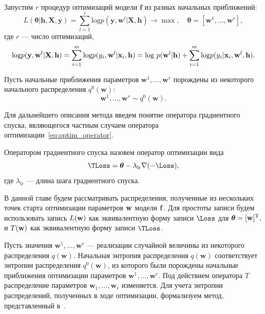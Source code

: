 Запустим $r$ процедур оптимизаций модели $\mathbf{f}$ из разных начальных приближений:
\[
	L( \boldsymbol{\theta}| \mathbf{h}, \mathbf{X}, \mathbf{y}) = \sum_{l=1}^r \text{log}p(\mathbf{y}, \mathbf{w}^l|\mathbf{X}, \mathbf{h})  \to \max, \quad \boldsymbol{\theta} = [\mathbf{w}^1, \dots, \mathbf{w}^r],
\] 
где $r$ --- число оптимизаций,
\begin{equation}
\label{eq:loss_func}
\text{log}p(\mathbf{y}, \mathbf{w}^l|\mathbf{X}, \mathbf{h}) = \sum_{i=1}^m \textnormal{log}p({y}_i, \mathbf{w}^l |\mathbf{x}_i, \mathbf{h}) = \textnormal{log}~p(\mathbf{w}^l|\mathbf{h}) + \sum_{i=1}^m \textnormal{log}p({y}_i |\mathbf{x}_i, \mathbf{w}^l, \mathbf{h}).
\end{equation}

Пусть начальные приближения параметров $\mathbf{w}^1, \dots, \mathbf{w}^r$ порождены из некоторого начального распределения $q^0(\mathbf{w})$:
\[ 
	\mathbf{w}^1, \dots, \mathbf{w}^r \sim q^0(\mathbf{w}). 
\]




Для дальнейшего описания метода введем понятие оператора градиентного спуска, являющегося частным случаем оператора оптимизации~\eqref{eq:optim_operator}.
\begin{defin}
Оператором градиентного спуска назовем оператор оптимизации вида
\begin{equation}
\label{eq:sgd}
	\TLoss  = \boldsymbol{\theta} - \lambda_{\text{lr}} \nabla (-\Loss), 
\end{equation}
где  $\lambda_{\text{lr}}$ --- длина шага градиентного спуска.
\end{defin}
В данной главе будем рассматривать распределения, полученные из нескольких точек старта оптимизации параметров $\mathbf{w}$ модели $\mathbf{f}$. Для простоты записи будем использовать запись $L(\mathbf{w})$ как эквивалентную форму записи $\Loss$ для $\boldsymbol{\theta} = [\mathbf{w}]^\text{T},$ и $T(\mathbf{w})$  как эквивалентную форму записи $\TLoss$. 

Пусть значения $\mathbf{w}^1, \dots, \mathbf{w}^r$  --- реализации случайной величины из некоторого распределения $q(\mathbf{w})$. Начальная энтропия распределения $q(\mathbf{w})$ соответствует энтропии распределения $q^0(\mathbf{w})$, из которого были порождены начальные приближения оптимизации параметров $\mathbf{w}^1, \dots, \mathbf{w}^r$. Под действием оператора $T$ распределение параметров $\mathbf{w}_1, \dots, \mathbf{w}_r$ изменяется. Для учета энтропии распределений, полученных в ходе оптимизации,
{ формализуем метод,  представленный в~\cite{early}. }

